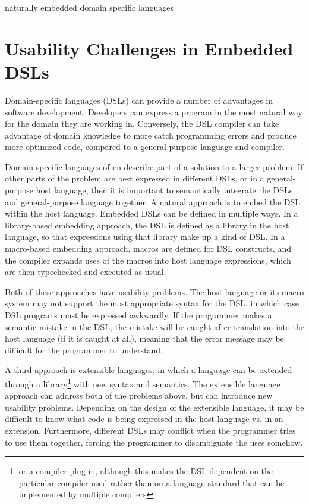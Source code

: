 \documentclass[preprint]{sigplanconf}
\begin{document}

%

\keywords
naturally embedded domain specific languages

\section{Usability Challenges in Embedded DSLs}

Domain-specific languages (DSLs) can provide a number of advantages in
software development.  Developers can express a program in the most
natural way for the domain they are working in.  Conversely, the DSL
compiler can take advantage of domain knowledge to more catch programming
errors and produce more optimized code, compared to a general-purpose
language and compiler.

Domain-specific languages often describe part of a solution to a
larger problem.  If other parts of the problem are best expressed in
different DSLs, or in a general-purpose host language, then it is
important to semantically integrate the DSLs and general-purpose
language together.  A natural approach is to embed the DSL within the
host language.  Embedded DSLs can be defined in multiple ways.  In a
library-based embedding approach, the DSL is defined as a library in
the host language, so that expressions using that library make up a
kind of DSL.  In a macro-based embedding approach, macros are defined
for DSL constructs, and the compiler expands uses of the macros into
host language expressions, which are then typechecked and executed
as usual.

Both of these approaches have usability problems.  The host language
or its macro system may not support the most appropriate syntax for
the DSL, in which case DSL programs must be expressed awkwardly.
If the programmer makes a semantic mistake in the DSL, the mistake
will be caught after translation into the host language (if it is
caught at all), meaning that the error message may be difficult for
the programmer to understand.

A third approach is extensible languages, in which a language
can be extended through a library\footnote{or a compiler plug-in,
although this makes the DSL dependent on the particular compiler
used rather than on a language standard that can be implemented
by multiple compilers} with new syntax and semantics.  The
extensible language approach can address both of the problems above,
but can introduce new usability problems.  Depending on the
design of the extensible language, it may be difficult to know
what code is being expressed in the host language vs. in an
extension.  Furthermore, different DSLs may conflict when the
programmer tries to use them together, forcing the programmer
to disambiguate the uses somehow.
\end{document}
